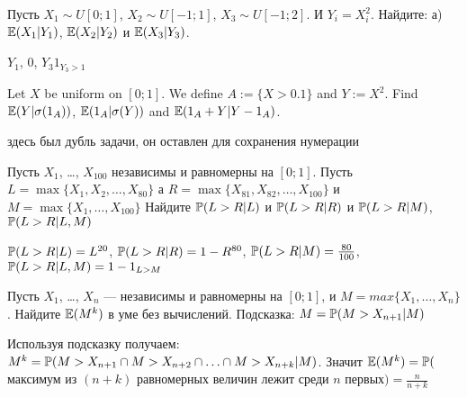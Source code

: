 \begin{solution}
\begin{solution}
\begin{solution}
\begin{solution}
\begin{solution}
\begin{solution}
\begin{solution}
\begin{problem}
Пусть $X_{1}\sim U[0;1]$, $X_{2}\sim U[-1;1]$, $X_{3}\sim U[-1;2]$. И $Y_{i}=X_{i}^{2}$. Найдите: а) $ \E(X_{1}|Y_{1}) $, $ \E(X_{2}|Y_{2}) $ и $ \E(X_{3}|Y_{3}) $.
\end{problem} 
\begin{solution} 
 $Y_{1}$, $0$, $Y_{3}1_{Y_{3}>1}$ 
\end{solution}

\begin{problem}
Let $ X $ be uniform on $[0;1]$. We define $ A:=\{X>0.1\} $ and $ Y:=X^{2} $. Find $ \E(Y|\sigma(1_{A})) $, $\E(1_{A}|\sigma(Y))$ and $\E(1_{A}+Y|Y-1_{A})$.
\end{problem} 
\begin{solution} 

\end{solution}

\begin{problem}
здесь был дубль задачи, он оставлен для сохранения нумерации
\end{problem} 
\begin{solution} 

\end{solution}

\begin{problem}
Пусть $ X_{1} $, \ldots, $ X_{100} $ независимы и равномерны на $ [0;1] $. Пусть $ L=\max\{X_{1},X_{2},\ldots, X_{80}\} $ а $ R=\max\{X_{81},X_{82},\ldots,X_{100}\} $ и $ M=\max\{X_{1},\ldots,X_{100}\} $ Найдите $ \P(L>R|L)$ и $ \P(L>R|R) $ и $ \P(L>R|M)$, $\P(L>R|L,M) $
\end{problem} 
\begin{solution} 
$ \P(L>R|L)=L^{20}$,  $ \P(L>R|R)=1-R^{80} $, $ \P(L>R|M)=\frac{80}{100}$, $\P(L>R|L,M)=1-1_{L>M} $  
\end{solution}

\begin{problem}
Пусть $ X_{1} $, \ldots, $ X_{n} $ --- независимы и равномерны на $ [0;1] $, и $ M=max\{X_{1},\ldots,X_{n}\} $. Найдите $\E(M^{k})$ в уме без вычислений. Подсказка: $ M=\P(M>X_{n+1}|M) $

\end{problem} 
\begin{solution} 
Используя подсказку получаем: $ M^{k}=\P(M>X_{n+1} \cap M>X_{n+2} \cap \ldots \cap M>X_{n+k}|M) $. Значит $ \E(M^{k})=\P($максимум из $ (n+k) $ равномерных величин лежит среди $ n $ первых$)=\frac{n}{n+k} $
\end{solution}


\end{solution}
\end{solution}
\end{solution}
\end{solution}
\end{solution}
\end{solution}
\end{solution}
